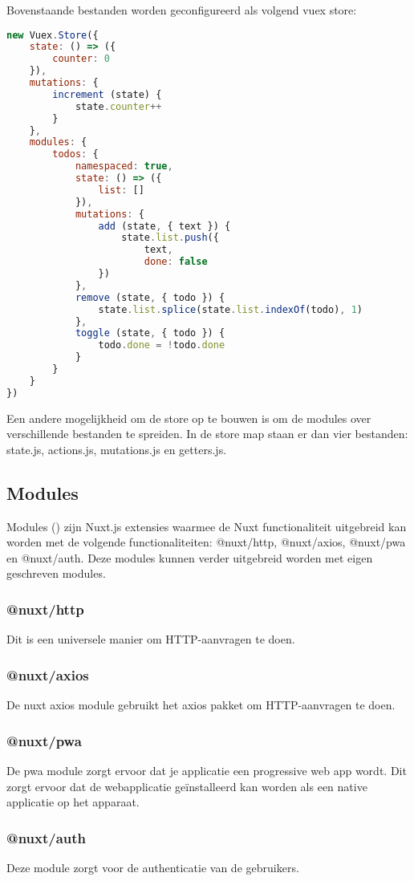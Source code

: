 Bovenstaande bestanden worden geconfigureerd als volgend vuex store:

\begin{lstlisting}[caption=Vuex store, language=Javascript]
new Vuex.Store({
	state: () => ({
		counter: 0
	}),
	mutations: {
		increment (state) {
			state.counter++
		}
	},
	modules: {
		todos: {
			namespaced: true,
			state: () => ({
				list: []
			}),
			mutations: {
				add (state, { text }) {
					state.list.push({
						text,
						done: false
				})
			},
			remove (state, { todo }) {
				state.list.splice(state.list.indexOf(todo), 1)
			},
			toggle (state, { todo }) {
				todo.done = !todo.done
			}
		}
	}
})
\end{lstlisting}

Een andere mogelijkheid om de store op te bouwen is om de modules over verschillende bestanden te spreiden. In de store map staan er dan vier bestanden: state.js, actions.js, mutations.js en getters.js.


\subsection{Modules}
Modules (\cite{NUXT_MODULES}) zijn Nuxt.js extensies waarmee de Nuxt functionaliteit uitgebreid kan worden met de volgende functionaliteiten: @nuxt/http, @nuxt/axios, @nuxt/pwa en @nuxt/auth. Deze modules kunnen verder uitgebreid worden met eigen geschreven modules.

\subsubsection{@nuxt/http}
Dit is een universele manier om HTTP-aanvragen te doen.

\subsubsection{@nuxt/axios}
De nuxt axios module gebruikt het axios pakket om HTTP-aanvragen te doen.

\subsubsection{@nuxt/pwa}
De pwa module zorgt ervoor dat je applicatie een progressive web app wordt. Dit zorgt ervoor dat de webapplicatie geïnstalleerd kan worden als een native applicatie op het apparaat.

\subsubsection{@nuxt/auth}
Deze module zorgt voor de authenticatie van de gebruikers.


